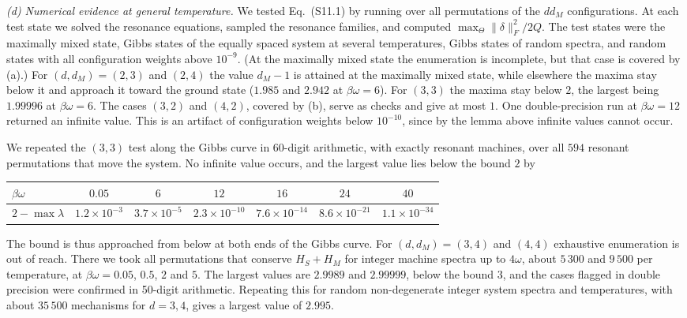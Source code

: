 \documentclass[aps,prl,reprint,superscriptaddress,amsmath,amssymb]{revtex4-2}
\begin{document}
\emph{(d) Numerical evidence at general temperature.} We tested Eq.~(S11.1) by running over all permutations of the
$dd_M$ configurations. At each test state we solved the resonance equations, sampled the resonance families, and
computed $\max_\Theta\|\delta\|_F^2/2Q$. The test states were the maximally mixed state, Gibbs states of the equally
spaced system at several temperatures, Gibbs states of random spectra, and random states with all configuration weights
above $10^{-9}$. (At the maximally mixed state the enumeration is incomplete, but that case is covered by (a).) For
$(d,d_M)=(2,3)$ and $(2,4)$ the value $d_M-1$ is attained at the maximally mixed state, while elsewhere the maxima stay
below it and approach it toward the ground state ($1.985$ and $2.942$ at $\beta\omega=6$). For $(3,3)$ the maxima stay
below $2$, the largest being $1.99996$ at $\beta\omega=6$. The cases $(3,2)$ and $(4,2)$, covered by (b), serve as
checks and give at most $1$. One double-precision run at $\beta\omega=12$ returned an infinite value. This is an artifact
of configuration weights below $10^{-10}$, since by the lemma above infinite values cannot occur.

We repeated the $(3,3)$ test along the Gibbs curve in 60-digit arithmetic, with exactly resonant machines, over all
$594$ resonant permutations that move the system. No infinite value occurs, and the largest value lies below the bound
$2$ by
\begin{center}
\begin{tabular}{lcccccc}
$\beta\omega$ & $0.05$ & $6$ & $12$ & $16$ & $24$ & $40$\\ \hline
$2-\max\lambda$ & $1.2\times10^{-3}$ & $3.7\times10^{-5}$ & $2.3\times10^{-10}$ & $7.6\times10^{-14}$ &
$8.6\times10^{-21}$ & $1.1\times10^{-34}$
\end{tabular}
\end{center}
The bound is thus approached from below at both ends of the Gibbs curve. For $(d,d_M)=(3,4)$ and $(4,4)$ exhaustive
enumeration is out of reach. There we took all permutations that conserve $H_S+H_M$ for integer machine spectra up to
$4\omega$, about $5\,300$ and $9\,500$ per temperature, at $\beta\omega=0.05$, $0.5$, $2$ and $5$. The largest values
are $2.9989$ and $2.99999$, below the bound $3$, and the cases flagged in double precision were confirmed in 50-digit
arithmetic. Repeating this for random non-degenerate integer system spectra and temperatures, with about $35\,500$
mechanisms for $d=3,4$, gives a largest value of $2.995$.
\end{document}

